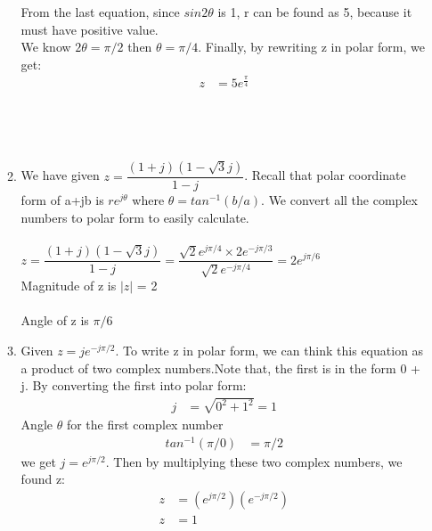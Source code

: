 \documentclass[10pt,a4paper, margin=1in]{article}
\begin{document}
\begin{enumerate}
\begin{enumerate}
	From the last equation, since $sin2\theta$ is 1, r can be found as 5, because it must have positive value.\\
	
	We know $2\theta= \pi/2$ then $\theta = \pi/4$. Finally, by rewriting z in polar form, we get:
    \begin{equation}
	\begin{split}
		z & = 5 e^{\frac{\pi}{4}}\\
	\end{split}
	\end{equation}\\
	\\
	\\
    \item %
    We have given $z = \dfrac{(1+j)(1-\sqrt{3}j)}{1-j}$. Recall that polar coordinate form of a+jb is $re^{j\theta}$ where $\theta = tan^{-1}(b/a)$. We convert all the complex numbers to polar form to easily calculate. \\
    \\
    $z = \dfrac{(1+j)(1-\sqrt{3}j)}{1-j} = \dfrac{\sqrt{2}e^{j\pi/4}\times 2e^{-j\pi/3}}{\sqrt{2}e^{-j\pi/4}} = 2e^{j\pi/6}$ \\
    
	Magnitude of z is $|z|$ = 2\\
	\\Angle of z is $\pi / 6$
	\\
	
	
    \item %
    Given $ z = je^{-j\pi/2}$. To write z in polar form, we can think this equation as a product of two complex numbers.Note that, the first is in the form 0 + j. By converting the first into polar form:
     \begin{equation}
	\begin{split}
		j &= \sqrt{0^2 + 1^2} = 1 
		\end{split}
	\end{equation}
	Angle $\theta$ for the first complex number
	\begin{equation}
	\begin{split}
		tan^{-1}(\pi / 0) &= \pi /2 
		\end{split}
	\end{equation}
    we get $j= e^{j \pi/2}.$
    Then by multiplying these two complex numbers, we found z:
        \begin{equation}
	\begin{split}
		z &= (e^{j \pi/2})(e^{-j \pi/2}) \\
		z &= 1
		\end{split}
	\end{equation}
    \end{enumerate}
    

\end{enumerate}
\end{document}
